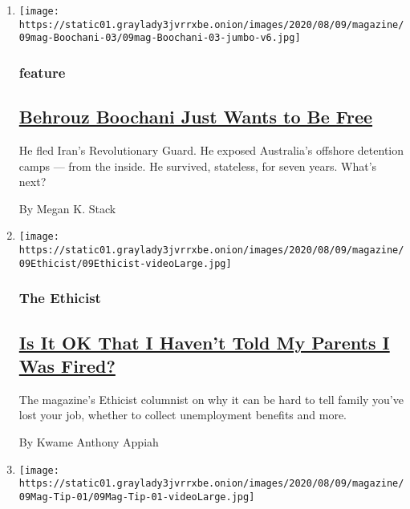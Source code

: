 \begin{enumerate}
\def\labelenumi{\arabic{enumi}.}
\item
  \texttt{[image: https://static01.graylady3jvrrxbe.onion/images/2020/08/09/magazine/09mag-Boochani-03/09mag-Boochani-03-jumbo-v6.jpg]}

  \hypertarget{feature}{%
  \subsubsection{feature}\label{feature}}

  \hypertarget{behrouz-boochani-just-wants-to-be-free}{%
  \subsection{\texorpdfstring{\href{/2020/08/04/magazine/behrouz-boochani-australia.html}{Behrouz
  Boochani Just Wants to Be
  Free}}{Behrouz Boochani Just Wants to Be Free}}\label{behrouz-boochani-just-wants-to-be-free}}

  He fled Iran's Revolutionary Guard. He exposed Australia's offshore
  detention camps --- from the inside. He survived, stateless, for seven
  years. What's next?

  By Megan K. Stack
\item
  \texttt{[image: https://static01.graylady3jvrrxbe.onion/images/2020/08/09/magazine/09Ethicist/09Ethicist-videoLarge.jpg]}

  \hypertarget{the-ethicist}{%
  \subsubsection{The Ethicist}\label{the-ethicist}}

  \hypertarget{is-it-ok-that-i-havent-told-my-parents-i-was-fired}{%
  \subsection{\texorpdfstring{\href{/2020/08/04/magazine/jobs-unemployment-ethics.html}{Is
  It OK That I Haven't Told My Parents I Was
  Fired?}}{Is It OK That I Haven't Told My Parents I Was Fired?}}\label{is-it-ok-that-i-havent-told-my-parents-i-was-fired}}

  The magazine's Ethicist columnist on why it can be hard to tell family
  you've lost your job, whether to collect unemployment benefits and
  more.

  By Kwame Anthony Appiah
\item
  \texttt{[image: https://static01.graylady3jvrrxbe.onion/images/2020/08/09/magazine/09Mag-Tip-01/09Mag-Tip-01-videoLarge.jpg]}


\end{enumerate}
